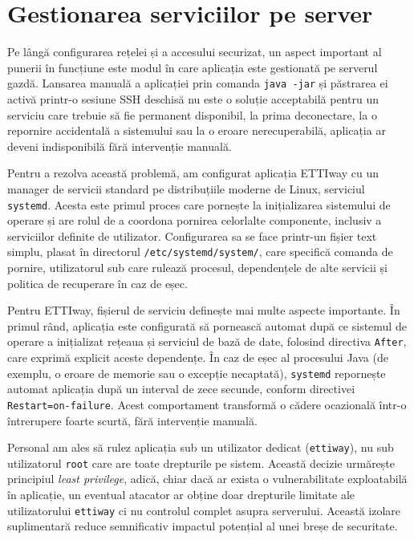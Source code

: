 

\section{Gestionarea serviciilor pe server}
\label{sec:systemd}
 
Pe lângă configurarea rețelei și a accesului securizat, un aspect important
al punerii în funcțiune este modul în care aplicația este gestionată pe
serverul gazdă. Lansarea manuală a aplicației prin comanda
\texttt{java -jar} și păstrarea ei activă printr-o sesiune SSH deschisă nu
este o soluție acceptabilă pentru un serviciu care trebuie să fie permanent
disponibil, la prima deconectare, la o repornire accidentală a sistemului sau
la o eroare nerecuperabilă, aplicația ar deveni indisponibilă fără
intervenție manuală.
 
Pentru a rezolva această problemă, am configurat aplicația ETTIway cu un manager de servicii standard pe distribuțiile
moderne de Linux, serviciul \texttt{systemd}. Acesta este primul proces care pornește la
inițializarea sistemului de operare și are rolul de a coordona pornirea
celorlalte componente, inclusiv a serviciilor definite de utilizator.
Configurarea sa se face printr-un fișier text simplu, plasat în directorul
\texttt{/etc/systemd/system/}, care specifică comanda de pornire, utilizatorul
sub care rulează procesul, dependențele de alte servicii și politica de
recuperare în caz de eșec.
 
Pentru ETTIway, fișierul de serviciu definește mai multe aspecte importante.
În primul rând, aplicația este configurată să pornească automat după ce
sistemul de operare a inițializat rețeaua și serviciul de bază de date,
folosind directiva \texttt{After}, care exprimă explicit aceste dependențe.
În caz de eșec al procesului Java (de exemplu, o eroare de
memorie sau o excepție necaptată), \texttt{systemd} repornește automat
aplicația după un interval de zece secunde, conform directivei
\texttt{Restart=on-failure}. Acest comportament transformă o cădere
ocazională într-o întrerupere foarte scurtă, fără intervenție manuală.
 
Personal am ales să rulez aplicația sub un utilizator dedicat
(\texttt{ettiway}), nu sub utilizatorul \texttt{root} care are toate
drepturile pe sistem. Această decizie urmărește principiul \textit{least
privilege}, adică, chiar dacă ar exista o vulnerabilitate exploatabilă în aplicație,
un eventual atacator ar obține doar drepturile limitate ale utilizatorului
\texttt{ettiway} ci nu controlul complet asupra serverului. Această izolare
suplimentară reduce semnificativ impactul potențial al unei breșe de
securitate.
 
